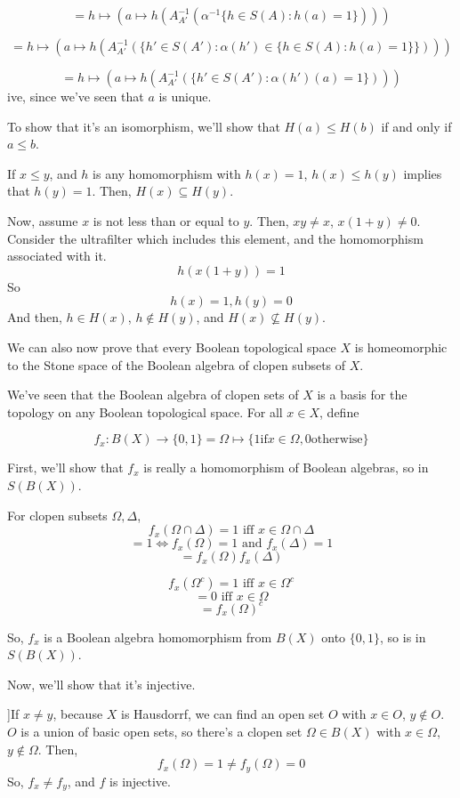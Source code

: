 \documentclass{article}
\begin{document}
      \[= h \mapsto (a \mapsto h ( A_{A'}^{-1} ( \alpha^{-1} \{h \in S(A) :
      h(a) = 1 \} )))\]

      \[= h \mapsto (a \mapsto h ( A_{A'}^{-1} ( \{h' \in S(A') :
      \alpha(h') \in \{ h \in S(A) : h(a) = 1\} \} )))\]

      \[= h \mapsto (a \mapsto h ( A_{A'}^{-1} ( \{h' \in S(A') :
      \alpha(h')(a) = 1\} )))\]
ive, since we've seen that $a$ is unique.

      To show that it's an isomorphism, we'll show that $H(a) \leq H(b)$ if and
      only if $a \leq b$.

      If $x \leq y$, and $h$ is any homomorphism with $h(x) = 1$, $h(x) \leq
      h(y)$ implies that $h(y) = 1$. Then, $H(x) \subseteq H(y)$.

      Now, assume $x$ is not less than or equal to $y$. Then, $xy \neq x$,
      $x(1+y) \neq 0$. Consider the ultrafilter which includes this element, and
      the homomorphism associated with it.
      \[h(x(1+y)) = 1\]
      So
      \[h(x) = 1, h(y) = 0\]
      And then, $h \in H(x)$, $h \notin  H(y)$, and $H(x) \nsubseteq H(y)$.


      We can also now prove that every Boolean topological space $X$ is
      homeomorphic to the Stone space of the Boolean algebra of clopen subsets of
      $X$.

      We've seen that the Boolean algebra of clopen sets of $X$ is a basis for
      the topology on any Boolean topological space. For all $x \in X$, define

      \[f_x: B(X) \rightarrow \{0,1\} = \Omega \mapsto \{1 \text {if} x \in
      \Omega, 0 \text {otherwise}\}\]

      First, we'll show that $f_x$ is really a homomorphism of Boolean algebras,
      so in $S(B(X))$. 

      For clopen subsets $\Omega, \Delta$,
      \[f_x(\Omega \cap \Delta) = 1 \text{ iff } x \in \Omega \cap \Delta\]
      \[= 1 \iff f_x(\Omega) = 1 \text{ and } f_x(\Delta) = 1\]
      \[= f_x(\Omega)f_x(\Delta)\]

      \[f_x(\Omega^c) = 1 \text{ iff } x \in \Omega^c\]
      \[ = 0 \text{ iff } x \in \Omega\]
      \[ = f_x(\Omega)^c\]

      So, $f_x$ is a Boolean algebra homomorphism from $B(X)$ onto $\{0,1\}$, so
      is in $S(B(X))$.

      Now, we'll show that it's injective.

      ]If $x \neq y$, because $X$ is Hausdorrf, we can find an open set $O$ with
      $x \in O$, $y \notin O$. $O$ is a union of basic open sets, so there's a
      clopen set $\Omega \in B(X)$ with $x \in \Omega$, $y\notin \Omega$. Then,
      \[f_x(\Omega) = 1 \neq f_y(\Omega) = 0\]
      So, $f_x \neq f_y$, and $f$ is injective.
\end{document}
